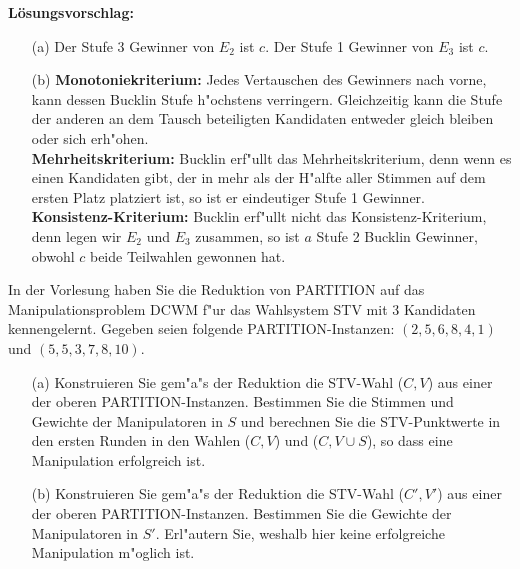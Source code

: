 \documentclass[a4paper,12pt,titlepage,oneside]{article}
\begin{document}
\noindent\textbf{L\"osungsvorschlag:}
\begin{enumerate} 
\item[(a)] Der Stufe 3 Gewinner von  $E_2$ ist $c$. Der Stufe 1 Gewinner von  $E_3$ ist $c$.
\item[(b)] \textbf{Monotoniekriterium:} Jedes Vertauschen des Gewinners nach vorne, kann dessen Bucklin Stufe h"ochstens verringern. Gleichzeitig kann die Stufe der anderen an dem Tausch beteiligten Kandidaten entweder gleich bleiben oder sich erh"ohen.\\
 \textbf{Mehrheitskriterium:} Bucklin erf"ullt das Mehrheitskriterium, denn wenn es einen Kandidaten gibt, der in mehr als der H"alfte aller Stimmen auf dem ersten Platz platziert ist, so ist er eindeutiger Stufe 1 Gewinner.\\
\textbf{Konsistenz-Kriterium:} Bucklin erf"ullt nicht das Konsistenz-Kriterium, denn legen wir $E_2$ und $E_3$ zusammen, so ist $a$ Stufe 2 Bucklin Gewinner, obwohl $c$ beide Teilwahlen gewonnen hat. 
\end{enumerate}
\newpage

 \newline
In der Vorlesung haben Sie die
Reduktion von PARTITION auf das Manipulationsproblem DCWM f"ur das Wahlsystem
STV mit 3 Kandidaten kennengelernt. Gegeben seien folgende PARTITION-Instanzen: $(2,5,6,8,4,1)$ und $(5,5,3,7,8,10)$.
\begin{enumerate}
\item[(a)]{Konstruieren Sie gem"a"s der Reduktion die STV-Wahl ($C, V$) aus einer der oberen PARTITION-Instanzen. Bestimmen Sie die Stimmen und Gewichte der Manipulatoren in $S$ und berechnen Sie die STV-Punktwerte in den ersten Runden in den Wahlen ($C, V$) und ($C, V \cup S$), so dass eine Manipulation erfolgreich ist.}
\item[(b)]{Konstruieren Sie gem"a"s der Reduktion die STV-Wahl ($C', V'$) aus einer der oberen PARTITION-Instanzen. Bestimmen Sie die Gewichte der Manipulatoren in $S'$. Erl"autern Sie, weshalb hier keine erfolgreiche Manipulation m"oglich ist.}
\end{enumerate}

\vspace{0.5cm}
\end{document}
